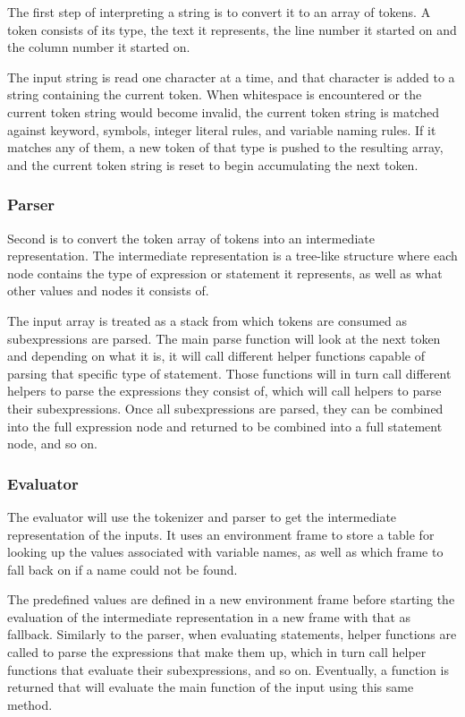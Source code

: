 The first step of interpreting a string is to convert it to an array of tokens. A token consists of its type, the text it represents, the line number it started on and the column number it started on.

The input string is read one character at a time, and that character is added to a string containing the current token. When whitespace is encountered or the current token string would become invalid, the current token string is matched against keyword, symbols, integer literal rules, and variable naming rules. If it matches any of them, a new token of that type is pushed to the resulting array, and the current token string is reset to begin accumulating the next token.

\subsubsection{Parser}

Second is to convert the token array of tokens into an intermediate representation. The intermediate representation is a tree-like structure where each node contains the type of expression or statement it represents, as well as what other values and nodes it consists of.

The input array is treated as a stack from which tokens are consumed as subexpressions are parsed. The main parse function will look at the next token and depending on what it is, it will call different helper functions capable of parsing that specific type of statement. Those functions will in turn call different helpers to parse the expressions they consist of, which will call helpers to parse their subexpressions. Once all subexpressions are parsed, they can be combined into the full expression node and returned to be combined into a full statement node, and so on.

\subsubsection{Evaluator}

The evaluator will use the tokenizer and parser to get the intermediate representation of the inputs. It uses an environment frame to store a table for looking up the values associated with variable names, as well as which frame to fall back on if a name could not be found.

The predefined values are defined in a new environment frame before starting the evaluation of the intermediate representation in a new frame with that as fallback. Similarly to the parser, when evaluating statements, helper functions are called to parse the expressions that make them up, which in turn call helper functions that evaluate their subexpressions, and so on. Eventually, a function is returned that will evaluate the main function of the input using this same method.

